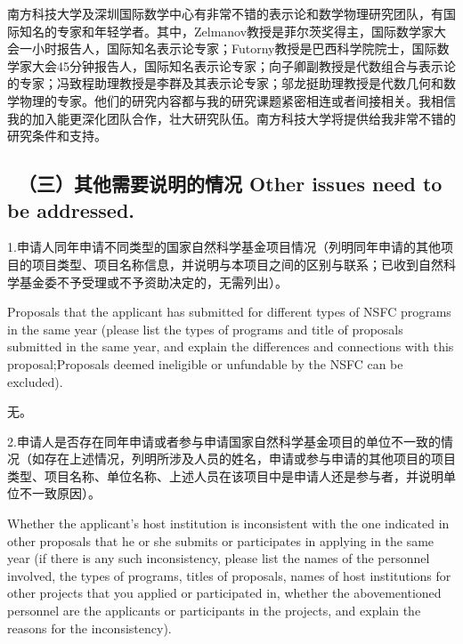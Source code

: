 \documentclass[12pt,UTF8,AutoFakeBold=4,a4paper]{ctexart}
\begin{document}
南方科技大学及深圳国际数学中心有非常不错的表示论和数学物理研究团队，有国际知名的专家和年轻学者。其中，Zelmanov教授是菲尔茨奖得主，国际数学家大会一小时报告人，国际知名表示论专家；Futorny教授是巴西科学院院士，国际数学家大会45分钟报告人，国际知名表示论专家；向子卿副教授是代数组合与表示论的专家；冯致程助理教授是李群及其表示论专家；邬龙挺助理教授是代数几何和数学物理的专家。他们的研究内容都与我的研究课题紧密相连或者间接相关。我相信我的加入能更深化团队合作，壮大研究队伍。南方科技大学将提供给我非常不错的研究条件和支持。

\bigskip

{\color{MsBlue} \subsection{\sihao \kaishu \qquad \ \bfseries（三）其他需要说明的情况 
\xiaosihao {} Other issues need to be addressed.}}
%

\bigskip

{\sihao \color{MsBlue} \kaishu 1.申请人同年申请不同类型的国家自然科学基金项目情况（列明同年申请的其他项目的项目类型、项目名称信息，并说明与本项目之间的区别与联系；已收到自然科学基金委不予受理或不予资助决定的，无需列出）。}

\bigskip

{\color{MsBlue} \xiaosihao {} 
Proposals that the applicant has submitted for different types of NSFC programs in the same year (please list the types of programs and title of proposals submitted in the same year, and explain the differences and connections with this proposal;Proposals deemed ineligible or unfundable by the NSFC can be excluded).}

\bigskip

无。

\bigskip

{\sihao \color{MsBlue} \kaishu 2.申请人是否存在同年申请或者参与申请国家自然科学基金项目的单位不一致的情况（如存在上述情况，列明所涉及人员的姓名，申请或参与申请的其他项目的项目类型、项目名称、单位名称、上述人员在该项目中是申请人还是参与者，并说明单位不一致原因）。}

\bigskip

{\color{MsBlue} \xiaosihao {} 
Whether the applicant's host institution is inconsistent with the one indicated in other proposals that he or she submits or participates in applying in the same year (if there is any such inconsistency, please list the names of the personnel involved, the types of programs, titles of proposals, names of host institutions for other projects that you applied or participated in, whether the abovementioned personnel are the applicants or participants in the projects, and explain the reasons for the inconsistency).}
\end{document}
